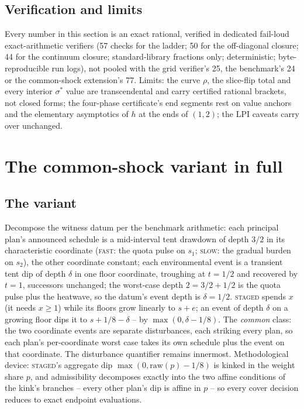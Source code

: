 \documentclass[preprint,11pt,authoryear]{elsarticle}
\theoremstyle{remark}
\newcommand{\act}[1]{\textsc{#1}}
\begin{document}
\subsection{Verification and limits}

Every number in this section is an exact rational, verified in dedicated fail-loud exact-arithmetic verifiers (57 checks for the ladder; 50 for the off-diagonal closure; 44 for the continuum closure; standard-library fractions only; deterministic; byte-reproducible run logs), not pooled with the grid verifier's 25, the benchmark's 24 or the common-shock extension's 77. Limits: the curve $\rho$, the slice-flip total and every interior $\sigma^*$ value are transcendental and carry certified rational brackets, not closed forms; the four-phase certificate's end segments rest on value anchors and the elementary asymptotics of $h$ at the ends of $(1,2)$; the LPI caveats carry over unchanged.

\section{The common-shock variant in full}\label{si:commonshock}

\subsection{The variant}

Decompose the witness datum per the benchmark arithmetic: each principal plan's announced schedule is a mid-interval tent drawdown of depth $3/2$ in its characteristic coordinate (\act{fast}: the quota pulse on $s_1$; \act{slow}: the gradual burden on $s_2$), the other coordinate constant; each environmental event is a transient tent dip of depth $\delta$ in one floor coordinate, troughing at $t=1/2$ and recovered by $t=1$, successors unchanged; the worst-case depth $2=3/2+1/2$ is the quota pulse plus the heatwave, so the datum's event depth is $\delta=1/2$. \act{staged} spends $x$ (it needs $x\ge1$) while its floors grow linearly to $s+e$; an event of depth $\delta$ on a growing floor dips it to $s+1/8-\delta$ -- by $\max(0,\delta-1/8)$. The \emph{common} class: the two coordinate events are separate disturbances, each striking every plan, so each plan's per-coordinate worst case takes its own schedule plus the event on that coordinate. The disturbance quantifier remains innermost. Methodological device: \act{staged}'s aggregate dip $\max(0,\mathrm{raw}(p)-1/8)$ is kinked in the weight share $p$, and admissibility decomposes exactly into the two affine conditions of the kink's branches -- every other plan's dip is affine in $p$ -- so every cover decision reduces to exact endpoint evaluations.
\end{document}
